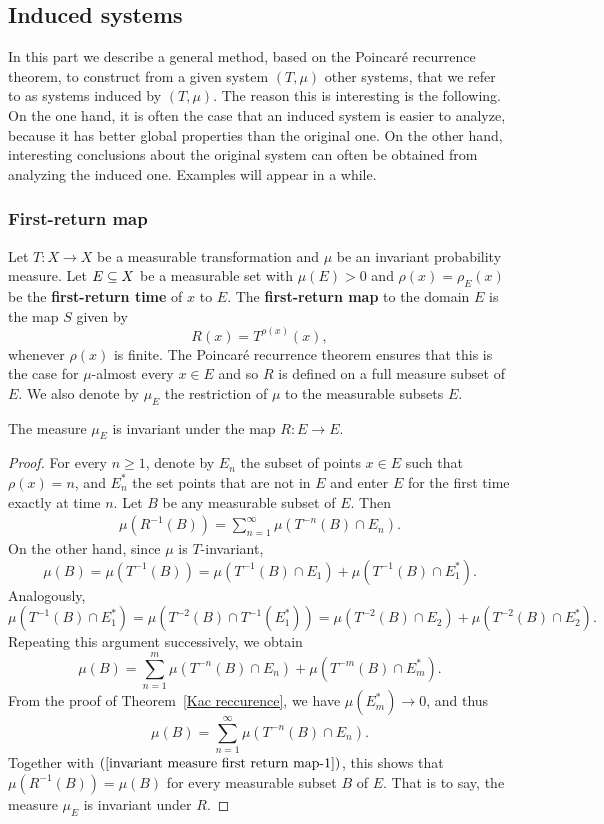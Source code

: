 \subsection{Induced systems}
In this part we describe a general method, based on the Poincar\'e recurrence theorem, to construct from a given system $(T,\mu)$ other systems, that we refer to as systems induced by $(T,\mu)$. The reason this is interesting is the following. On the one hand, it is often the case that an induced system is easier to analyze, because it has better global properties than the original one. On the other hand, interesting conclusions about the original system can often be obtained from analyzing the induced one. Examples will appear in a while.
\subsubsection{First-return map}
Let $T:X\to X$ be a measurable transformation and $\mu$ be an invariant probability measure. Let $E\subseteq X$ be a measurable set with $\mu(E)>0$ and $\rho(x)=\rho_E(x)$ be the \textbf{first-return time} of $x$ to $E$. The \textbf{first-return map} to the domain $E$ is the map $S$ given by
\[R(x)=T^{\rho(x)}(x),\]
whenever $\rho(x)$ is finite. The Poincar\'e recurrence theorem ensures that this is the case for $\mu$-almost every $x\in E$ and so $R$ is defined on a full measure subset of $E$. We also denote by $\mu_E$ the restriction of $\mu$ to the measurable subsets $E$.
\begin{proposition}\label{invariant measure first return map}
The measure $\mu_E$ is invariant under the map $R:E\to E$.
\end{proposition}
\begin{proof}
For every $n\geq 1$, denote by $E_n$ the subset of points $x\in E$ such that $\rho(x)=n$, and $E_n^*$ the set points that are not in $E$ and enter $E$ for the first time exactly at time $n$. Let $B$ be any measurable subset of $E$. Then
\begin{align}\label{invariant measure first return map-1}
\mu(R^{-1}(B))=\sum_{n=1}^{\infty}\mu(T^{-n}(B)\cap E_n).
\end{align}
On the other hand, since $\mu$ is $T$-invariant,
\[\mu(B)=\mu(T^{-1}(B))=\mu(T^{-1}(B)\cap E_1)+\mu(T^{-1}(B)\cap E_1^*).\]
Analogously,
\[\mu(T^{-1}(B)\cap E_1^*)=\mu(T^{-2}(B)\cap T^{-1}(E_1^*))=\mu(T^{-2}(B)\cap E_2)+\mu(T^{-2}(B)\cap E_2^*).\]
Repeating this argument successively, we obtain
\[\mu(B)=\sum_{n=1}^{m}\mu(T^{-n}(B)\cap E_n)+\mu(T^{-m}(B)\cap E_m^*).\]
From the proof of Theorem~\ref{Kac reccurence}, we have $\mu(E_m^*)\to 0$, and thus
\[\mu(B)=\sum_{n=1}^{\infty}\mu(T^{-n}(B)\cap E_n).\]
Together with $(\ref{invariant measure first return map-1})$, this shows that $\mu(R^{-1}(B))=\mu(B)$ for every measurable subset $B$ of $E$. That is to say, the measure $\mu_E$ is invariant under $R$.
\end{proof}

